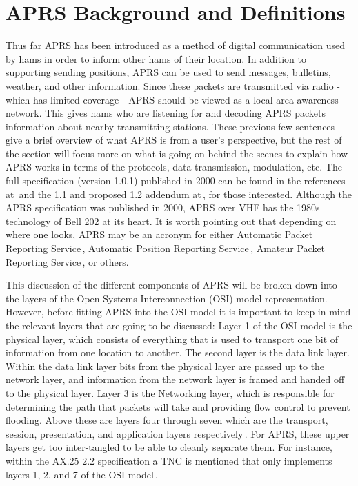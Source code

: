 \chapter{APRS Background and Definitions}
Thus far APRS has been introduced as a method of digital communication used by hams in order to inform other hams of their location. In addition to supporting sending positions, APRS can be used to send messages, bulletins, weather, and other information. Since these packets are transmitted via radio  - which has limited coverage - APRS should be viewed as a local area awareness network. This gives hams who are listening for and decoding APRS packets information about nearby transmitting stations. These previous few sentences give a brief overview of what APRS is from a user's perspective, but the rest of the section will focus more on what is going on behind-the-scenes to explain how APRS works in terms of the protocols, data transmission, modulation, etc. The full specification (version 1.0.1) published in 2000 can be found in the references at\,\cite{Group2000} and the 1.1 and proposed 1.2 addendum at\,\cite{Bruninga2004,Bruninga2013}, for those interested. Although the APRS specification was published in 2000, APRS over VHF has the 1980s technology of Bell 202 at its heart. It is worth pointing out that depending on where one looks, APRS may be an acronym for either Automatic Packet Reporting Service\,\cite{Bruninga}, Automatic Position Reporting Service\,\cite{Smith2012}, Amateur Packet Reporting Service\,\cite{Holder2012}, or others.

This discussion of the different components of APRS will be broken down into the layers of the Open Systems Interconnection (OSI) model representation. However, before fitting APRS into the OSI model it is important to keep in mind the relevant layers that are going to be discussed: Layer 1 of the OSI model is the physical layer, which consists of everything that is used to transport one bit of information from one location to another. The second layer is the data link layer. Within the data link layer bits from the physical layer are passed up to the network layer, and information from the network layer is framed and handed off to the physical layer. Layer 3 is the Networking layer, which is responsible for determining the path that packets will take and providing flow control to prevent flooding. Above these are layers four through seven which are the transport, session, presentation, and application layers respectively\,\cite{Sosinsky2009}. For APRS, these upper layers get too inter-tangled to be able to cleanly separate them. For instance, within the AX.25 2.2 specification a TNC is mentioned that only implements layers 1, 2, and 7 of the OSI model\,\cite{Beech1998}.

